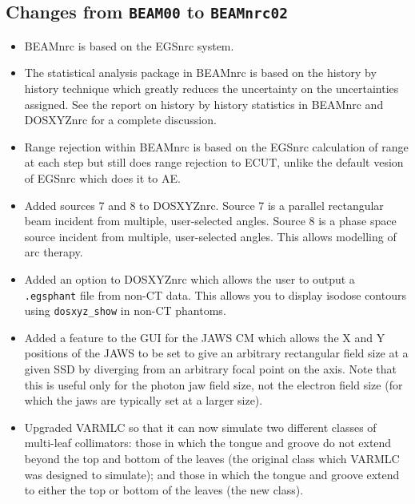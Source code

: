 \documentclass[12pt,twoside]{article}
\begin{document}
\subsection{Changes from {\tt BEAM00} to {\tt BEAMnrc02}}

\begin{itemize}

\item BEAMnrc is based on the EGSnrc system.

\item The statistical analysis package in BEAMnrc is based on the history
by history technique which greatly reduces the uncertainty on the
uncertainties assigned. See the report on history by history
statistics in BEAMnrc and DOSXYZnrc \cite{Wa02a} for a complete discussion.

\item Range rejection within BEAMnrc is based on the EGSnrc calculation of
range at each step but still does range rejection to ECUT, unlike the
default vesion of EGSnrc which does it to AE.

\item Added sources 7 and 8 to DOSXYZnrc.  Source 7 is a parallel rectangular
beam incident from multiple, user-selected angles.  Source 8 is a phase
space source incident from multiple, user-selected angles.  This allows
modelling of arc therapy.

\item Added an option to DOSXYZnrc which allows the user to output a
{\tt .egsphant} file from non-CT data.  This allows you to display isodose
contours using {\tt dosxyz\_show} in non-CT phantoms.

\item Added a feature to the GUI for the JAWS CM which allows the X and Y
positions of the JAWS to be set to give an arbitrary rectangular field size
at a given SSD by diverging from an arbitrary focal point on the axis. Note
that this is useful only for the photon jaw field size, not the electron
field size (for which the jaws are typically set at a larger size).

\item Upgraded VARMLC so that it can now simulate two different classes of
multi-leaf collimators: those in which the tongue and groove do not extend
beyond the top and bottom of the leaves (the original class which VARMLC
was designed to simulate); and those in which the tongue and groove extend
to either the top or bottom of the leaves (the new class).


\end{itemize}
\end{document}

